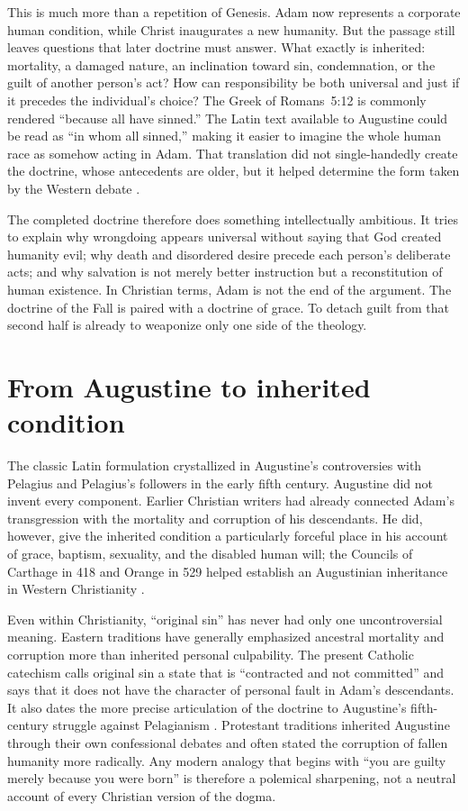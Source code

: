 ﻿\documentclass[12pt,a4paper]{book}
\begin{document}
This is much more than a repetition of Genesis.  Adam now represents a
corporate human condition, while Christ inaugurates a new humanity.  But the
passage still leaves questions that later doctrine must answer.  What exactly
is inherited: mortality, a damaged nature, an inclination toward sin,
condemnation, or the guilt of another person's act?  How can responsibility be
both universal and just if it precedes the individual's choice?  The Greek of
Romans~5:12 is commonly rendered ``because all have sinned.''  The Latin text
available to Augustine could be read as ``in whom all sinned,'' making it
easier to imagine the whole human race as somehow acting in Adam.  That
translation did not single-handedly create the doctrine, whose antecedents
are older, but it helped determine the form taken by the Western debate
\cite{BeatriceTransmissionSin2013}.

The completed doctrine therefore does something intellectually ambitious.  It
tries to explain why wrongdoing appears universal without saying that God
created humanity evil; why death and disordered desire precede each person's
deliberate acts; and why salvation is not merely better instruction but a
reconstitution of human existence.  In Christian terms, Adam is not the end
of the argument.  The doctrine of the Fall is paired with a doctrine of grace.
To detach guilt from that second half is already to weaponize only one side of
the theology.

\section{From Augustine to inherited condition}

The classic Latin formulation crystallized in Augustine's controversies with
Pelagius and Pelagius's followers in the early fifth century.  Augustine did
not invent every component.  Earlier Christian writers had already connected
Adam's transgression with the mortality and corruption of his descendants.
He did, however, give the inherited condition a particularly forceful place in
his account of grace, baptism, sexuality, and the disabled human will; the
Councils of Carthage in 418 and Orange in 529 helped establish an Augustinian
inheritance in Western Christianity
\cite{BeatriceTransmissionSin2013,TimpeChristianSin2021}.

Even within Christianity, ``original sin'' has never had only one
uncontroversial meaning.  Eastern traditions have generally emphasized
ancestral mortality and corruption more than inherited personal culpability.
The present Catholic catechism calls original sin a state that is
``contracted and not committed'' and says that it does not have the character
of personal fault in Adam's descendants.  It also dates the more precise
articulation of the doctrine to Augustine's fifth-century struggle against
Pelagianism \cite[paras.~404--406]{CatechismOriginalSin}.  Protestant
traditions inherited Augustine through their own confessional debates and
often stated the corruption of fallen humanity more radically.  Any modern
analogy that begins with ``you are guilty merely because you were born'' is
therefore a polemical sharpening, not a neutral account of every Christian
version of the dogma.
\end{document}

